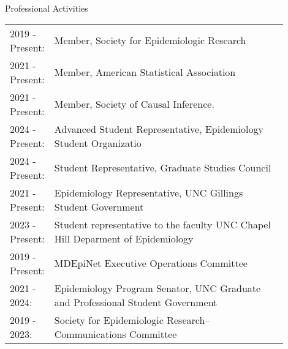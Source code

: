 \documentclass{resume} %
\begin{document}
\begin{rSection}{Professional Activities}
   \begin{tabular}{lp{0.90\linewidth}}
   2019 - Present:& Member, Society for Epidemiologic Research\\
   2021 - Present: & Member, American Statistical Association\\
   2021 - Present: & Member, Society of  Causal Inference.\\
   2024 - Present: &Advanced Student Representative, Epidemiology Student Organizatio\\
   2024 - Present: & Student Representative, Graduate Studies Council \\ 
   2021 - Present: & Epidemiology Representative, UNC Gillings Student Government \\
   2023 - Present: & Student representative to the faculty UNC Chapel Hill Deparment of Epidemiology\\
   2019 - Present: & MDEpiNet Executive Operations Committee\\
   2021 - 2024: & Epidemiology Program Senator,  UNC Graduate and Professional Student Government\\ 
   2019 - 2023:& Society for Epidemiologic Research--Communications Committee
   \end{tabular}
   \end{rSection}
\end{document}
